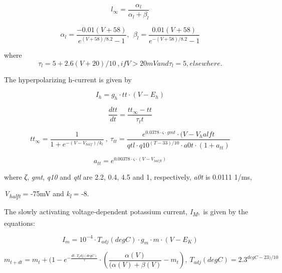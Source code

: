 \documentclass[a4paper]{article}
\begin{document}
\begin{equation}
l_{\infty }=\frac{α_l}{α_l+β_l}
\end{equation}

\begin{equation}
α_l=\frac{-0.01(V+58)}{e^{(V+58)/8.2}-1} ,\ \  β_l=\frac{0.01(V+58)}{e^{-(V+58)/8.2}-1}
\end{equation}

where
\begin{equation}
τ_l=5+2.6(V+20)/10\ , if V > 20 mV and  τ_l=5, elsewhere.
\end{equation}

The hyperpolarizing h-current is given by

\begin{equation}
I_h=g_h\cdot tt \cdot (V-E_h)
\end{equation}

\begin{equation}
\frac{dtt}{dt}=\frac{tt_{\infty}-tt}{τ_tt}
\end{equation}

\begin{equation}
tt_{\infty }=\frac {1}{1+e^{-(V-V_{half})/k_l}} \ , \ 
τ_{tt}=\frac{e^{0.0378\cdot ς\cdot gmt}\cdot
(V-V_halft}{qtl \cdot q10^{(T-33)/10}\cdot a0t \cdot
(1+a_{tt})}
\end{equation}

\begin{equation}
a_{tt}=e^{0.00378\cdot ς\cdot (V-V_{halft})}
\end{equation}

{where }{\textsf{\textit{ζ}}}{, }{\textit{gmt}}{, }{\textit{q10}}{ and }{\textit{qtl}}{ are 2.2, 0.4, 4.5 and 1,
respectively, }{\textit{a0t}}{ is 0.0111 1/ms,}



{\textit{V}}{\textit{\textsubscript{halft}}}{ = -75mV and }{\textit{k}}{\textit{\textsubscript{l}}}{ = -8.}



The slowly activating voltage‑dependent potassium current, \textit{I}\textit{\textsubscript{M}},~is given by the
equations:


\begin{equation}
I_m=10^{-4}\cdot T_{adj}(degC)\cdot g_m\cdot m\cdot
(V-E_K)
\end{equation}



\begin{equation}
m_{t+dt}=m_t+(1-e^{-\frac{dt \cdot T_adj(degC)}{τ}}\cdot (\frac{α(V)}{(α(V)+β(V)}-m_t), \ 
 T_{adj}(degC)=2.3^{degC-23)/10}
\end{equation}
\end{document}
